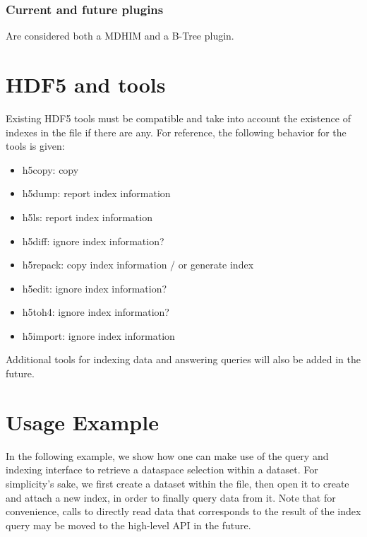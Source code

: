 \subsubsection{Current and future plugins}

Are considered both a MDHIM and a B-Tree plugin.

\section{HDF5 and tools}

Existing HDF5 tools must be compatible and take into account the existence of
indexes in the file if there are any. For reference, the following behavior for
the tools is given:

\begin{itemize}
\item h5copy: copy
\item h5dump: report index information
\item h5ls: report index information
\item h5diff: ignore index information?
\item h5repack: copy index information / or generate index
\item h5edit: ignore index information?
\item h5toh4: ignore index information?
\item h5import: ignore index information
\end{itemize}

Additional tools for indexing data and answering queries will also be added
in the future.

\section{Usage Example}

In the following example, we show how one can make use of the query and
indexing interface to retrieve a dataspace selection within a dataset.
For simplicity's sake, we first create a dataset within the file, then open it to
create and attach a new index, in order to finally query data from it.
Note that for convenience, calls to directly read data that corresponds to the
result of the index query may be moved to the high-level API in the future.

